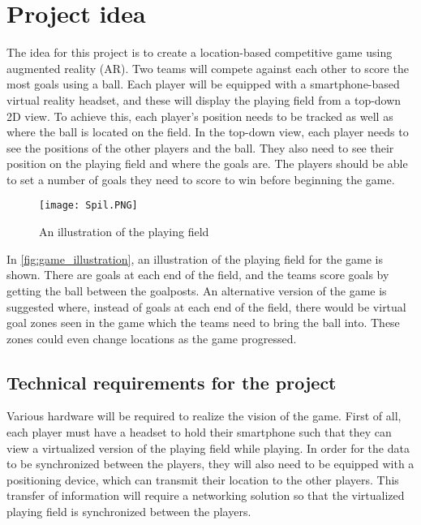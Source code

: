 \section{Project idea}\label{sec:projectidea}
The idea for this project is to create a location-based competitive game using augmented reality (AR).
Two teams will compete against each other to score the most goals using a ball. 
Each player will be equipped with a smartphone-based virtual reality headset, and these will display the playing field from a top-down 2D view. 
To achieve this, each player's position needs to be tracked as well as where the ball is located on the field.
In the top-down view, each player needs to see the positions of the other players and the ball.
They also need to see their position on the playing field and where the goals are.
The players should be able to set a number of goals they need to score to win before beginning the game. 
\begin{figure}[H]
    \centering
    \texttt{[image: Spil.PNG]}
    \caption{An illustration of the playing field}
    \label{fig:game_illustration}
\end{figure}
\noindent
In \autoref{fig:game_illustration}, an illustration of the playing field for the game is shown.
There are goals at each end of the field, and the teams score goals by getting the ball between the goalposts.
An alternative version of the game is suggested where, instead of goals at each end of the field, there would be virtual goal zones seen in the game which the teams need to bring the ball into.
These zones could even change locations as the game progressed.

\subsection{Technical requirements for the project}
Various hardware will be required to realize the vision of the game.
First of all, each player must have a headset to hold their smartphone such that they can view a virtualized version of the playing field while playing.
In order for the data to be synchronized between the players, they will also need to be equipped with a positioning device, which can transmit their location to the other players.
This transfer of information will require a networking solution so that the virtualized playing field is synchronized between the players.

